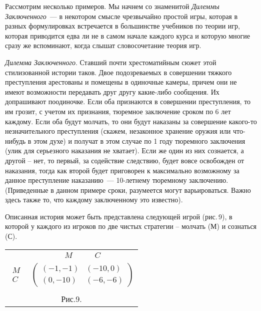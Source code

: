 \documentclass[12pt]{article}
\begin{document}
Рассмотрим несколько примеров. Мы начнем со знаменитой {\it Дилеммы
Заключенного}~--- в некотором смысле чрезвычайно простой игры,
которая в разных формулировках встречается в большинстве учебников
по теории игр, которая приводится едва ли не в самом начале каждого
курса и которую многие сразу же вспоминают, когда слышат
словосочетание теория игр.

{\it Дилемма Заключенного}. Ставший почти хрестоматийным сюжет
этой стилизованной истории таков. Двое подозреваемых в совершении
тяжкого преступления арестованы и помещены в одиночные камеры,
причем они не имеют возможности передавать друг другу какие-либо
сообщения. Их допрашивают поодиночке. Если оба признаются в
совершении преступления, то им грозит, с учетом их признания,
тюремное заключение сроком по 6 лет каждому. Если оба будут
молчать, то они будут наказаны за совершение какого-то
незначительного преступления (скажем, незаконное хранение оружия
или что-нибудь в этом духе) и получат в этом случае по 1 году
тюремного заключения (улик для серьезного наказания не хватает).
Если же один из них сознается, а другой -- нет, то первый, за
содействие следствию, будет вовсе освобожден от наказания, тогда
как второй будет приговорен к максимально возможному за данное
преступление наказанию~--- 10-летнему тюремному заключению.
(Приведенные в данном примере сроки, разумеется могут
варьироваться. Важно здесь также то, что каждому заключенному это
известно).

Описанная история может быть представлена следующей игрой
(рис.\,9), в которой у каждого из игроков по две чистых стратегии
-- молчать (М) и сознаться (С).

\begin{center}
\begin{tabular}{cc}
&$\begin{array}{cc} M\quad &\quad C \end{array}$\\
$\begin{array}{c} M\\  C\end{array}$& $\left(\begin{array}{cc}
(-1,-1)&(-10,0)\\
(0,-10)&(-6,-6) \end{array}\right)$\\
\multicolumn{2}{c}{}\\
\multicolumn{2}{c}{Рис.9.}\\
\end{tabular}
\end{center}
\end{document}
